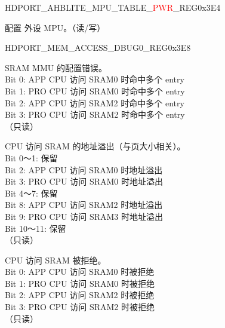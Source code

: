 \begin{register}{H}{DPORT\_AHBLITE\_MPU\_TABLE\_\textcolor{red}{PWR}\_REG}{0x3E4}\label{regdesc:AHBLITEMPUTABLEPWRREG}
%
%
\regnewline%
\begin{regdesc}\begin{reglist}
\item [DPORT\_AHBLITE\_\textcolor{red}{*}\_ACCESS\_GRANT\_CONFIG] 配置 外设 MPU。（读/写）
\end{reglist}\end{regdesc}
\end{register}

\begin{register}{H}{DPORT\_MEM\_ACCESS\_DBUG0\_REG}{0x3E8}\label{regdesc:MEMACCESSDBUG0REG}
%
%
%
%
%
\regnewline%
\begin{regdesc}\begin{reglist}
\item [DPORT\_MEM\_MMU\_MULTI\_HIT] SRAM MMU 的配置错误。\\
Bit 0: APP CPU 访问 SRAM0 时命中多个 entry\\
Bit 1: PRO CPU 访问 SRAM0 时命中多个 entry\\
Bit 2: APP CPU 访问 SRAM2 时命中多个 entry\\
Bit 3: PRO CPU 访问 SRAM2 时命中多个 entry\\
（只读）
\item [DPORT\_MEM\_ACCESS\_ILLEGAL] CPU 访问 SRAM 的地址溢出（与页大小相关）。\\
Bit 0～1: 保留\\
Bit 2: APP CPU 访问 SRAM0 时地址溢出\\
Bit 3: PRO CPU 访问 SRAM0 时地址溢出\\
Bit 4～7: 保留\\
Bit 8: APP CPU 访问 SRAM2 时地址溢出\\
Bit 9: PRO CPU 访问 SRAM3 时地址溢出\\
Bit 10～11: 保留\\
（只读）
\item [DPORT\_MEM\_ACCESS\_DENY] CPU 访问 SRAM 被拒绝。\\
Bit 0: APP CPU 访问 SRAM0 时被拒绝\\
Bit 1: PRO CPU 访问 SRAM0 时被拒绝\\
Bit 2: APP CPU 访问 SRAM2 时被拒绝\\
Bit 3: PRO CPU 访问 SRAM2 时被拒绝\\
（只读）
\end{reglist}\end{regdesc}
\end{register}

